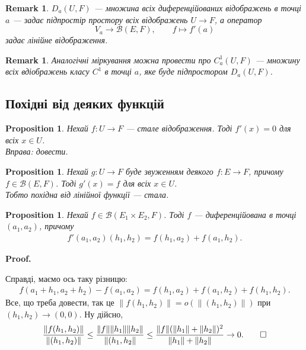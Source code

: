 \documentclass[a4paper, 10pt]{article}
\makeatletter
\theoremstyle{theoremdd}
\theoremstyle{theoremdd}
\theoremstyle{theoremdd}
\theoremstyle{theoremdd}
\theoremstyle{theoremdd}
\newtheorem{proposition}[theorem]{Proposition}
\theoremstyle{theoremdd}
\newtheorem{remark}[theorem]{Remark}
\theoremstyle{theoremdd}
\theoremstyle{theoremdd}
\renewenvironment{proof}[1][Proof.\\]{\par
\pushQED{\hfill \qed}%
\normalfont \topsep6\p@\@plus6\p@\relax
\trivlist
\item\relax
{\bfseries
#1\@addpunct{.}}\hspace\labelsep\ignorespaces
}{%
\popQED\endtrivlist\@endpefalse
}
\makeatother
\begin{document}
\begin{remark}
$D_a(U, F)$ --- множина всіх диференційованих відображень в точці $a$ --- задає підпростір простору всіх відображень $U \to F$, а оператор
\[ 
V_a \to \mathcal{B}(E,F), \qquad f \mapsto f'(a)
\]
задає лінійне відображення.
\end{remark}

\begin{remark}
Аналогічні міркування можна провести про $C^1_a(U, F)$ --- множину всіх вдіображень класу $C^1$ в точці $a$, яке буде підпростором $D_a(U, F)$.
\end{remark}

\subsection{Похідні від деяких функцій}
\begin{proposition}
Нехай $f \colon U \to F$ --- стале відображення. Тоді $f'(x) = 0$ для всіх $x \in U$.\\
\textit{Вправа: довести.}
\end{proposition}

\begin{proposition}
Нехай $g \colon U \to F$ буде звуженням деякого $f \colon E \to F$, причому $f \in \mathcal{B}(E,F)$. Тоді $g'(x) = f$ для всіх $x \in U$.\\
\textit{Тобто похідна від лінійної функції --- стала.}
\end{proposition}

\begin{proposition}
Нехай $f \in \mathcal{B}(E_1 \times E_2, F)$. Тоді $f$ --- диференційована в точці $(a_1,a_2)$, причому
\begin{align*}
f'(a_1,a_2) (h_1,h_2) = f(h_1,a_2) + f(a_1,h_2).
\end{align*}
\end{proposition}

\begin{proof}
Справді, маємо ось таку різницю:
\begin{align*}
f(a_1+h_1,a_2+h_2) - f(a_1,a_2) = f(h_1,a_2) + f(a_1,h_2) + f(h_1,h_2).
\end{align*}
Все, що треба довести, так це $\|f(h_1,h_2)\| = o(\|(h_1,h_2)\|)$ при $(h_1,h_2) \to (0,0)$. Ну дійсно,
\[
\dfrac{\|f(h_1,h_2)\|}{\|(h_1,h_2)\|} \leq \dfrac{\|f\| \|h_1\| \|h_2\|}{\| (h_1,h_2\|} \leq \dfrac{\|f\| (\|h_1\| + \|h_2\|)^2}{\|h_1\| + \|h_2\|} \to 0. \qedhere
\]
\end{proof}
\end{document}
